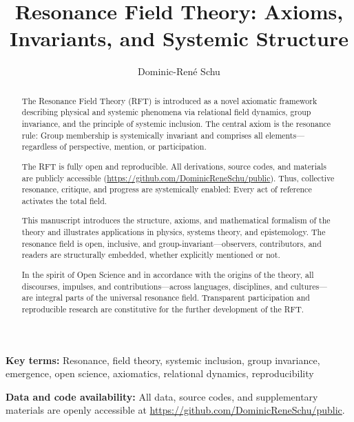 \documentclass[12pt]{iopart}
\begin{document}
	
	\title{Resonance Field Theory: Axioms, Invariants, and Systemic Structure}
	
	\author{Dominic-René Schu}
	\address{Independent Researcher, Germany\\
		\href{https://github.com/DominicReneSchu/public}{https://github.com/DominicReneSchu/public}\\
		ORCID: 0000-0003-XXXX-XXXX\\
		Email: dominic.rene.schu@gmail.com}
	
	\begin{abstract}
		The Resonance Field Theory (RFT) is introduced as a novel axiomatic framework describing physical and systemic phenomena via relational field dynamics, group invariance, and the principle of systemic inclusion. The central axiom is the resonance rule: Group membership is systemically invariant and comprises all elements—regardless of perspective, mention, or participation.
		
		The RFT is fully open and reproducible. All derivations, source codes, and materials are publicly accessible (\url{https://github.com/DominicReneSchu/public}). Thus, collective resonance, critique, and progress are systemically enabled: Every act of reference activates the total field.
		
		This manuscript introduces the structure, axioms, and mathematical formalism of the theory and illustrates applications in physics, systems theory, and epistemology. The resonance field is open, inclusive, and group-invariant—observers, contributors, and readers are structurally embedded, whether explicitly mentioned or not.
		
		In the spirit of Open Science and in accordance with the origins of the theory, all discourses, impulses, and contributions—across languages, disciplines, and cultures—are integral parts of the universal resonance field. Transparent participation and reproducible research are constitutive for the further development of the RFT.
	\end{abstract}
	
\noindent\textbf{Key terms:} Resonance, field theory, systemic inclusion, group invariance, emergence, open science, axiomatics, relational dynamics, reproducibility

\medskip

\noindent\textbf{Data and code availability:} All data, source codes, and supplementary materials are openly accessible at \url{https://github.com/DominicReneSchu/public}.
\end{document}
